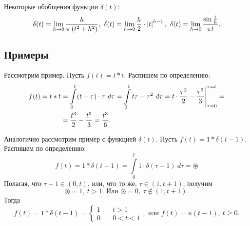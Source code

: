 	Некоторые обобщения функции $\delta(t)$:
	\[ 
		\delta(t) 
			= \lim_{h \to 0} \frac{h}{\pi \left( t^2 + h^2 \right)}, ~ \delta(t) 
			= \lim_{h \to 0} \frac{h}{2} \cdot \left\vert t \right\vert^{h - 1}, ~ \delta(t) 
			= \lim_{h \to 0} \frac{\sin{\frac{t}{h}}}{\pi t}. 
	\]

	\subsection{Примеры}

		Рассмотрим пример. Пусть $f(t) = t * t$. Распишем по определению:
		\[ \begin{split} 
			f(t) = t * t &= \int\limits_{0}^{t} (t-\tau) \cdot \tau ~ d \tau 
				= \int\limits_{0}^{t} t \tau - \tau^2 ~ d \tau 
				= t \cdot \frac{\tau^2}{2} - \frac{\tau^3}{3} \Biggl\vert \Biggr._{\tau = 0}^{\tau = t} 
				= \\ 
			&= \frac{t^3}{2} - \frac{t^3}{3} = \frac{t^3}{6}.
		\end{split} \]
		
		\vspace{10pt}
		
		Аналогично рассмотрим пример с функцией $\delta(t)$. Пусть $f(t) = 1 * \delta(t-1)$. Распишем по определению:
		\[ f(t) = 1 * \delta(t-1) = \int\limits_{0}^{t} 1 \cdot \delta(\tau - 1) ~ d \tau = \circledast \]
		Полагая, что $\tau - 1 \in (0, t)$, или, что то же, $\tau \in (1, t+1)$, получим
		\[ \circledast = 1, ~ t > 1. \text{ Или } \circledast = 0, ~ \tau \notin (1, t+1). \]
		Тогда
		\[ f(t) = 1 * \delta(t-1) = \left\lbrace \begin{split} 1 \quad &t > 1 \\ 0 \quad &0 < t < 1 \end{split} \right., \text{ или }  f(t) = u(t-1), ~ t \ge 0. \]

